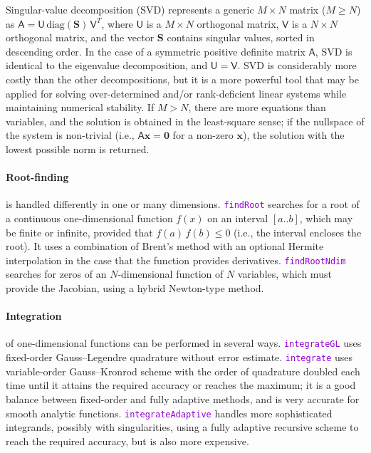 \documentclass[12pt]{article}
\newcommand{\ttt}[1]{\textcolor{darkviolet}{\texttt{#1}}}
\newcommand{\bx}{\boldsymbol{x}}
\let\oldparagraph\paragraph
\renewcommand{\paragraph}[1]{\vspace{-2mm}\oldparagraph{#1}}
\begin{document}
Singular-value decomposition (SVD) represents a generic $M\times N$ matrix ($M\ge N$) as $\mathsf{A}=\mathsf{U}\,\mathrm{diag}(\boldsymbol{S})\,\mathsf{V}^T$, where $\mathsf{U}$ is a $M\times N$ orthogonal matrix, $\mathsf{V}$ is a $N\times N$ orthogonal matrix, and the vector $\boldsymbol{S}$ contains singular values, sorted in descending order. In the case of a symmetric positive definite matrix $\mathsf{A}$, SVD is identical to the eigenvalue decomposition, and $\mathsf{U}=\mathsf{V}$.
SVD is considerably more costly than the other decompositions, but it is a more powerful tool that may be applied for solving over-determined and/or rank-deficient linear systems while maintaining numerical stability.
If $M>N$, there are more equations than variables, and the solution is obtained in the least-square sense; if the nullspace of the system is non-trivial (i.e., $\mathsf{A}\bx=\boldsymbol{0}$ for a non-zero $\bx$), the solution with the lowest possible norm is returned.

\paragraph{Root-finding}  is handled differently in one or many dimensions.
\ttt{findRoot} searches for a root of a continuous one-dimensional function $f(x)$ on an interval $[a..b]$, which may be finite or infinite, provided that $f(a)\,f(b) \le 0$ (i.e., the interval encloses the root). It uses a combination of Brent's method with an optional Hermite interpolation in the case that the function provides derivatives.
\ttt{findRootNdim} searches for zeros of an $N$-dimensional function of $N$ variables, which must provide the Jacobian, using a hybrid Newton-type method.

\paragraph{Integration}  of one-dimensional functions can be performed in several ways. \ttt{integrateGL} uses fixed-order Gauss--Legendre quadrature without error estimate. \ttt{integrate} uses variable-order Gauss--Kronrod scheme with the order of quadrature doubled each time until it attains the required accuracy or reaches the maximum; it is a good balance between fixed-order and fully adaptive methods, and is very accurate for smooth analytic functions. \ttt{integrateAdaptive} handles more sophisticated integrands, possibly with singularities, using a fully adaptive recursive scheme to reach the required accuracy, but is also more expensive.
\end{document}
